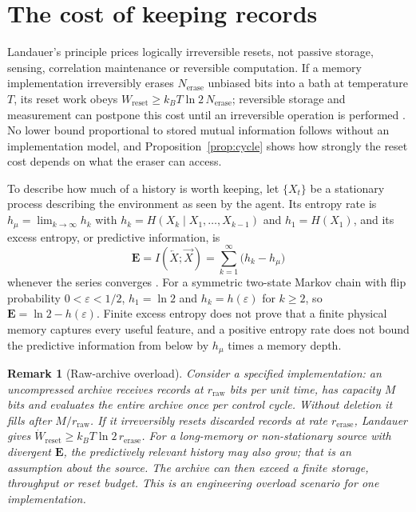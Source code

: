 \documentclass[12pt]{article}
\newtheorem{remark}[theorem]{Remark}
\begin{document}
\section{The cost of keeping records}
\label{sec:cost}

Landauer's principle prices logically irreversible resets, not passive storage, sensing, correlation maintenance or reversible computation. If a memory implementation irreversibly erases $N_{\mathrm{erase}}$ unbiased bits into a bath at temperature $T$, its reset work obeys $W_{\mathrm{reset}}\ge k_BT\ln2\,N_{\mathrm{erase}}$; reversible storage and measurement can postpone this cost until an irreversible operation is performed \cite{Landauer1961,Bennett1982}. No lower bound proportional to stored mutual information follows without an implementation model, and Proposition~\ref{prop:cycle} shows how strongly the reset cost depends on what the eraser can access.

To describe how much of a history is worth keeping, let $\{X_t\}$ be a stationary process describing the environment as seen by the agent. Its entropy rate is $h_\mu=\lim_{k\to\infty}h_k$ with $h_k=H(X_k\mid X_1,\dots,X_{k-1})$ and $h_1=H(X_1)$, and its excess entropy, or predictive information, is
\begin{equation}
\label{eq:pred_info}
\mathbf E=I(\overleftarrow X;\overrightarrow X)=\sum_{k=1}^\infty\bigl(h_k-h_\mu\bigr)
\end{equation}
whenever the series converges \cite{CrutchfieldFeldman2003,BialekNemenmanTishby2001,ShaliziCrutchfield2001}. For a symmetric two-state Markov chain with flip probability $0<\varepsilon<1/2$, $h_1=\ln2$ and $h_k=h(\varepsilon)$ for $k\ge2$, so $\mathbf E=\ln2-h(\varepsilon)$. Finite excess entropy does not prove that a finite physical memory captures every useful feature, and a positive entropy rate does not bound the predictive information from below by $h_\mu$ times a memory depth.

\begin{remark}[Raw-archive overload]
\label{rem:archive_overload}
Consider a specified implementation: an uncompressed archive receives records at $r_{\mathrm{raw}}$ bits per unit time, has capacity $M$ bits and evaluates the entire archive once per control cycle. Without deletion it fills after $M/r_{\mathrm{raw}}$. If it irreversibly resets discarded records at rate $r_{\mathrm{erase}}$, Landauer gives $\dot W_{\mathrm{reset}}\ge k_BT\ln2\,r_{\mathrm{erase}}$. For a long-memory or non-stationary source with divergent $\mathbf E$, the predictively relevant history may also grow; that is an assumption about the source. The archive can then exceed a finite storage, throughput or reset budget. This is an engineering overload scenario for one implementation.
\end{remark}
\end{document}
